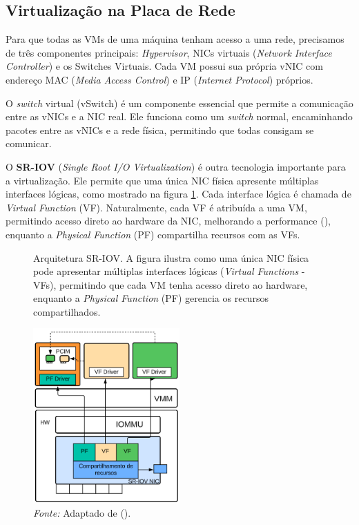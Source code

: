 \subsection{Virtualização na Placa de Rede}

Para que todas as VMs de uma máquina tenham acesso a uma rede, precisamos de três componentes principais: \textit{Hypervisor}, NICs virtuais (\textit{Network Interface Controller}) e os Switches Virtuais. Cada VM possui sua própria vNIC com endereço MAC (\textit{Media Access Control}) e IP (\textit{Internet Protocol}) próprios. 

O \textit{switch} virtual (vSwitch) é um componente essencial que permite a comunicação entre as vNICs e a NIC real. Ele funciona como um \textit{switch} normal, encaminhando pacotes entre as vNICs e a rede física, permitindo que todas consigam se comunicar.

O \textbf{SR-IOV} (\textit{Single Root I/O Virtualization}) é outra tecnologia importante para a virtualização. Ele permite que uma única NIC física apresente múltiplas interfaces lógicas, como mostrado na figura \ref{fig:single_root_IO_virtualization}. Cada interface lógica é chamada de \textit{Virtual Function} (VF). Naturalmente, cada VF é atribuída a uma VM, permitindo acesso direto ao hardware da NIC, melhorando a performance (\cite{dong2012high}), enquanto a \textit{Physical Function} (PF) compartilha recursos com as VFs.

\begin{figure}[htbp]
  \centering
  \caption{Arquitetura SR-IOV. A figura ilustra como uma única NIC física pode apresentar múltiplas interfaces lógicas (\textit{Virtual Functions} - VFs), permitindo que cada VM tenha acesso direto ao hardware, enquanto a \textit{Physical Function} (PF) gerencia os recursos compartilhados.}
  \includegraphics[width=0.5\textwidth]{images/single_root_IO_virtualization.png}
  \caption*{\textit{Fonte:} Adaptado de (\cite{dong2012high}).}
  \label{fig:single_root_IO_virtualization}
\end{figure}


